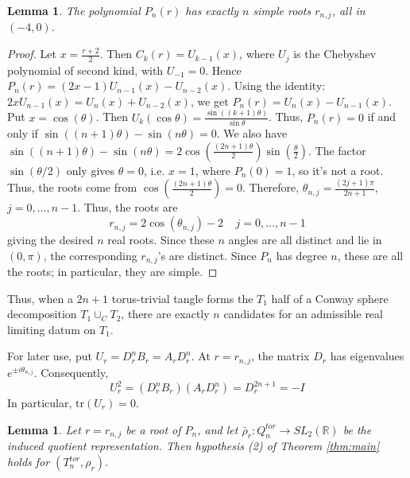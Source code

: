 \documentclass{article}
\theoremstyle{plain}
\theoremstyle{definition}
\theoremstyle{plain}
\theoremstyle{plain}
\theoremstyle{plain}
\newtheorem{lemma}[theorem]{Lemma}
\theoremstyle{remark}
\theoremstyle{remark}
\theoremstyle{plain}
\theoremstyle{plain}
\newcounter{main}
\theoremstyle{plain}
\theoremstyle{plain}
\begin{document}
\begin{lemma}\label{lma:roots}
The polynomial $P_n(r)$ has exactly $n$ simple roots $r_{n,j}$, all in $(-4, 0)$.
\end{lemma}

\begin{proof}
Let $x = \frac{r+2}{2}$. Then $C_k(r) = U_{k-1}(x)$, where $U_j$ is the Chebyshev polynomial of second kind, with $U_{-1} = 0$. Hence $P_n(r) = (2x-1)U_{n-1}(x) - U_{n-2}(x)$. Using the identity: $2xU_{n-1}(x) = U_n(x) + U_{n-2}(x)$, we get $P_n(r) = U_n(x) - U_{n-1}(x)$. Put $x = \cos(\theta)$. Then $U_k(\cos\theta) = \frac{\sin((k+1)\theta)}{\sin\theta}$. Thus, $P_n(r) = 0$ if and only if $\sin((n+1)\theta) - \sin(n\theta) = 0$. We also have $\sin((n+1)\theta) - \sin(n\theta) = 2\cos(\frac{(2n+1)\theta}{2})\sin(\frac{\theta}{2})$. The factor $\sin(\theta/2)$ only gives $\theta = 0$, i.e. $x = 1$, where $P_n(0) = 1$, so it's not a root. Thus, the roots come from $\cos(\frac{(2n+1)\theta}{2}) = 0$. Therefore, $\theta_{n,j} = \frac{(2j+1)\pi}{2n+1}$, $j = 0, \dots, n-1$. Thus, the roots are 
\begin{equation*}
	r_{n,j} = 2\cos(\theta_{n,j}) - 2 \ \ \ \ \ j = 0, \dots, n - 1
\end{equation*}
giving the desired $n$ real roots. Since these $n$ angles are all distinct and lie in $(0, \pi)$, the corresponding $r_{n,j}$'s are distinct. Since $P_n$ has degree $n$, these are all the roots; in particular, they are simple.
\end{proof}

Thus, when a $2n+1$ torus-trivial tangle forms the $T_1$ half of a Conway sphere decomposition $T_1 \cup_C T_2$, there are exactly $n$ candidates for an admissible real limiting datum on $T_1$. 

\medskip

For later use, put $U_r = D_r^nB_r = A_rD_r^n$. At $r = r_{n,j}$, the matrix $D_r$ has eigenvalues $e^{\pm i\theta_{n,j}}$. Consequently, 
\begin{equation}\label{eq:minusI}
	U_r^2 = (D_r^nB_r)(A_rD_r^n) = D_r^{2n+1} = -I
\end{equation}
In particular, $\mathrm{tr}(U_r) = 0$. 

\begin{lemma}\label{lma:torustrivial2}
Let $r = r_{n,j}$ be a root of $P_n$, and let $\bar\rho_r: Q_n^{tor} \to SL_2(\mathbb{R})$ be the induced quotient representation. Then hypothesis (2) of Theorem \ref{thm:main} holds for $(T_n^{tor}, \rho_r)$.
\end{lemma}
\end{document}
